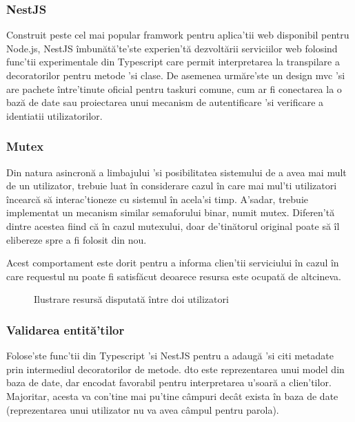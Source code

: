 \subsubsection {NestJS}

Construit peste cel mai popular framwork pentru aplica'tii web disponibil pentru Node.js, NestJS îmbunătă'te'ste experien'tă dezvoltării serviciilor web folosind func'tii experimentale din Typescript care permit interpretarea la transpilare a decoratorilor pentru metode 'si clase. De asemenea urmăre'ste un design \acrshort{mvc} 'si are pachete între'tinute oficial pentru taskuri comune, cum ar fi conectarea la o bază de date sau proiectarea unui mecanism de autentificare 'si verificare a identiatii utilizatorilor.

\subsubsection {Mutex}

Din natura asincronă a limbajului 'si posibilitatea sistemului de a avea mai mult de un utilizator, trebuie luat în considerare cazul în care mai mul'ti utilizatori încearcă să interac'tioneze cu sistemul în acela'si timp. A'sadar, trebuie implementat un mecanism similar semaforului binar, numit mutex. Diferen'tă dintre acestea fiind că în cazul mutexului, doar de'tinătorul original poate să îl elibereze spre a fi folosit din nou.

Acest comportament este dorit pentru a informa clien'tii serviciului în cazul în care requestul nu poate fi satisfăcut deoarece resursa este ocupată de altcineva.

\begin{figure}[H]
  \centering
  \caption{Ilustrare resursă disputată între doi utilizatori}
\end{figure}


\subsubsection {Validarea entită'tilor}

Folose'ste func'tii din Typescript 'si NestJS pentru a adaugă 'si citi metadate prin intermediul decoratorilor de metode. \acrfull{dto} este reprezentarea unui model din baza de date, dar encodat favorabil pentru interpretarea u'soară a clien'tilor. Majoritar, acesta va con'tine mai pu'tine câmpuri decât exista în baza de date (reprezentarea unui utilizator nu va avea câmpul pentru parola).

